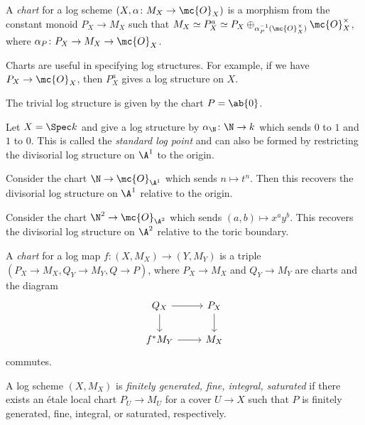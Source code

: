 \begin{defn}
    A \textit{chart} for a log scheme \((X, \alpha \colon M_X \to \mc{O}_X)\) is a morphism from the constant monoid \(P_X \to M_X\) such that \(M_X \simeq P_X^a \simeq P_X \oplus_{\alpha_P^{-1}(\mc{O}_X^{\times})} \mc{O}_X^{\times}\), where \(\alpha_P \colon P_X \to M_X \to \mc{O}_X\).
\end{defn}

Charts are useful in specifying log structures. For example, if we have \(P_X \to \mc{O}_X\), then \(P_X^a\) gives a log structure on \(X\).

\begin{exm}
    The trivial log structure is given by the chart \(P = \ab\{0\}\).
\end{exm}

\begin{exm}
    Let \(X = \Spec k\) and give a log structure by \(\alpha_{\N} \colon \N \to k\) which sends \(0\) to \(1\) and \(1\) to \(0\). This is called the \textit{standard log point} and can also be formed by restricting the divisorial log structure on \(\A^1\) to the origin.
\end{exm}

\begin{exm}
    Consider the chart \(\N \to \mc{O}_{\A^1}\) which sends \(n \mapsto t^n\). Then this recovers the divisorial log structure on \(\A^1\) relative to the origin.
\end{exm}

\begin{exm}
    Consider the chart \(\N^2 \to \mc{O}_{\A^2}\) which sends \((a,b) \mapsto x^a y^b\). This recovers the divisorial log structure on \(\A^2\) relative to the toric boundary.   
\end{exm}

\begin{defn}
    A \textit{chart} for a log map \(f \colon (X, M_X) \to (Y, M_Y)\) is a triple \((P_X\to M_X, Q_Y \to M_Y, Q \to P)\), where \(P_X \to M_X\) and \(Q_Y \to M_Y\) are charts and the diagram
    \begin{equation*}
    \begin{tikzcd}
        Q_X \ar{r} \ar{d} & P_X \ar{d} \\
        f^* M_Y \ar{r} & M_X
    \end{tikzcd}
    \end{equation*}
    commutes.
\end{defn}

\begin{defn}
    A log scheme \((X, M_X)\) is \textit{finitely generated, fine, integral, saturated} if there exists an \'etale local chart \(P_U \to M_U\) for a cover \(U \to X\) such that \(P\) is finitely generated, fine, integral, or saturated, respectively.
\end{defn}

